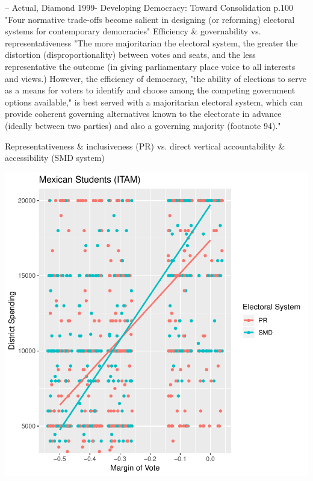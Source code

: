 \documentclass{article}
\begin{document}
--
Actual, Diamond 1999- Developing Democracy: Toward Consolidation p.100
"Four normative trade-offs become salient in designing (or reforming) electoral systems for contemporary democracies"
Efficiency \& governability vs. representativeness
"The more majoritarian the electoral system, the greater the distortion (disproportionality) between votes and seats, and the less representative the outcome (in giving parliamentary place voice to all interests and views.) However, the efficiency of democracy, "the ability of elections to serve as a means for voters to identify and choose among the competing government options available," is best served with a majoritarian electoral system, which can provide coherent governing alternatives known to the electorate in advance (ideally between two parties) and also a governing majority (footnote 94)."

Representativeness \& inclusiveness (PR) vs. direct vertical accountability \& accessibility (SMD system)

\fi




\includegraphics{Dilgin_MPSA-002}






\end{document}

